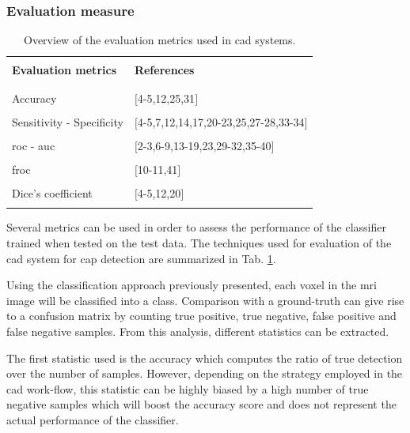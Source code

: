 \subsubsection{Evaluation measure}\label{subsubsec:eval}

\begin{table}
	\caption{Overview of the evaluation metrics used in \ac{cad} systems.}
	\small
	\begin{tabular}{p{.55\linewidth} p{.35\linewidth}}
		\hline \\ [-1.5ex]
		\textbf{Evaluation metrics} & \textbf{References} \\ \\ [-1.5ex]
		\hline \\ [-1.5ex]
		\quad Accuracy & $[$4-5,12,25,31$]$ \\ \\ [-1.5ex]
		\quad Sensitivity - Specificity & $[$4-5,7,12,14,17,20-23,25,27-28,33-34$]$ \\ \\ [-1.5ex]
		\quad \acs{roc} - \acs{auc} & $[$2-3,6-9,13-19,23,29-32,35-40$]$ \\ \\ [-1.5ex]
		\quad \acs{froc} & $[$10-11,41$]$ \\ \\ [-1.5ex]
		\quad Dice's coefficient & $[$4-5,12,20$]$ \\ \\ [-1.5ex]
		\hline
	\end{tabular}
	\label{tab:evatec}
\end{table}

Several metrics can be used in order to assess the performance of the classifier trained when tested on the test data. The techniques used for evaluation of the \ac{cad} system for \ac{cap} detection are summarized in Tab. \ref{tab:evatec}.

Using the classification approach previously presented, each voxel in the \ac{mri} image will be classified into a class. Comparison with a ground-truth can give rise to a confusion matrix by counting true positive, true negative, false positive and false negative samples. From this analysis, different statistics can be extracted. 

The first statistic used is the accuracy which computes the ratio of true detection over the number of samples. However, depending on the strategy employed in the \ac{cad} work-flow, this statistic can be highly biased by a high number of true negative samples which will boost the accuracy score and does not represent the actual performance of the classifier.

